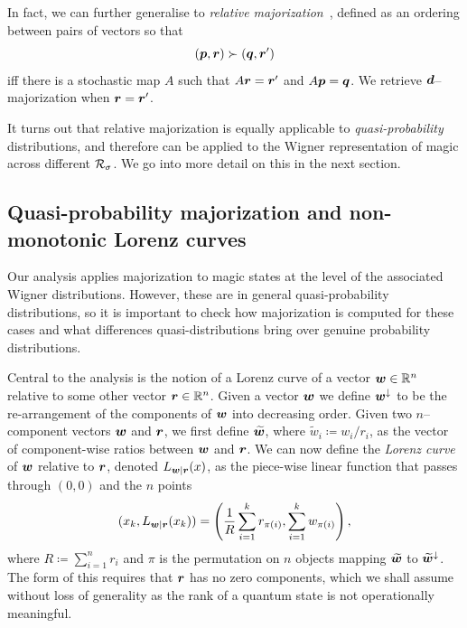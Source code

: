 \documentclass[pra,
aps,
twocolumn,
superscriptaddress,
groupedaddress,
nofootinbib,
reprint
]{revtex4-1}
\begin{document}
In fact, we can further generalise to \emph{relative majorization}~\cite{Blackwell_1953, Ruch_1976, ruch_mixing_1978, Renes_2016, Buscemi_2017, Rethinasamy_2020}, defined as an ordering between pairs of vectors so that 
\begin{equation}
	(\boldsymbol{p},\boldsymbol{r}) \succ (\boldsymbol{q}, \boldsymbol{r}')
\end{equation}
iff there is a stochastic map $A$ such that $A\boldsymbol{r} = \boldsymbol{r}'$ and $A\boldsymbol{p} = \boldsymbol{q}$. We retrieve $\bm{d}$--majorization when $\boldsymbol{r} = \boldsymbol{r}'$.

It turns out that relative majorization is equally applicable to \emph{quasi-probability} distributions, and therefore can be applied to the Wigner representation of magic across different ${\mathcal R}_\sigma$. We go into more detail on this in the next section.

\subsection{Quasi-probability majorization and non-monotonic Lorenz curves}
\label{sec:lc}

Our analysis applies majorization to magic states at the level of the associated Wigner distributions. However, these are in general quasi-probability distributions, so it is important to check how majorization is computed for these cases and what differences quasi-distributions bring over genuine probability distributions.

Central to the analysis is the notion of a Lorenz curve of a vector $\boldsymbol{w} \in \mathbb{R}^n$ relative to some other vector $\boldsymbol{r} \in \mathbb{R}^n$. Given a vector $\boldsymbol{w}$ we define $\boldsymbol{w}^\downarrow$ to be the re-arrangement of the components of $\boldsymbol{w}$ into decreasing order. Given two $n$--component vectors $\boldsymbol{w}$ and $\boldsymbol{r}$, we first define $\widetilde{\boldsymbol{w}}$, where $\widetilde{w}_i \coloneqq w_i/r_i$, as the vector of component-wise ratios between $\boldsymbol{w}$ and $\boldsymbol{r}$.
We can now define the \emph{Lorenz curve} of $\boldsymbol{w}$ relative to $\boldsymbol{r}$, denoted $L_{\boldsymbol{w}|\boldsymbol{r}}(x)$, as the piece-wise linear function that passes through $(0,0)$ and the $n$ points
\begin{equation}
\label{eq:lc}
        (x_k,L_{\boldsymbol{w}|\boldsymbol{r}}(x_k)) =\left( \frac{1}{R}\sum_{i=1}^k r_{\pi(i)}, \sum_{i=1}^k w_{\pi(i)} \right),
\end{equation}
where $R\coloneqq \sum_{i=1}^n r_i$ and $\pi$ is the permutation on $n$ objects mapping $\widetilde{\boldsymbol{w}}$ to $\widetilde{\boldsymbol{w}}^{\downarrow}$. The form of this requires that $\boldsymbol{r}$ has no zero components, which we shall assume without loss of generality as the rank of a quantum state is not operationally meaningful.
\end{document}
